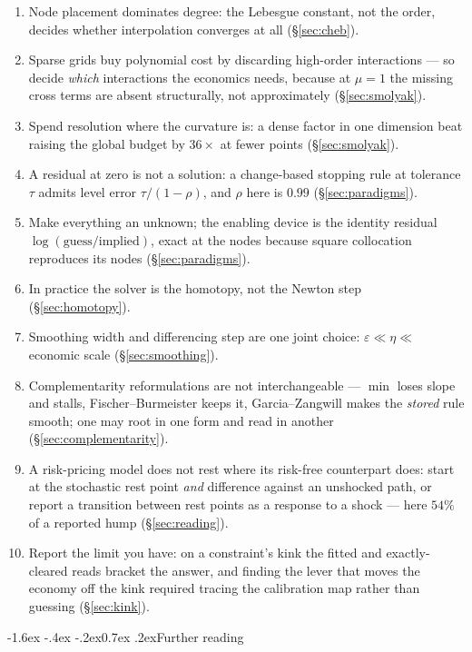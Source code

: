 \documentclass[10pt,a4paper]{article}
\makeatletter
\theoremstyle{definition}
\theoremstyle{plain}
\theoremstyle{remark}
\renewcommand\section{\@startsection{section}{1}{\z@}%
  {-1.6ex \@plus -.4ex \@minus -.2ex}{0.7ex \@plus.2ex}{\normalfont\large\bfseries}}
\makeatother
\begin{document}
\begin{enumerate}\itemsep0pt
\item Node placement dominates degree: the Lebesgue constant, not the order, decides whether
interpolation converges at all (\S\ref{sec:cheb}).
\item Sparse grids buy polynomial cost by discarding high-order interactions --- so decide
\emph{which} interactions the economics needs, because at $\mu=1$ the missing cross terms are
absent structurally, not approximately (\S\ref{sec:smolyak}).
\item Spend resolution where the curvature is: a dense factor in one dimension beat raising
the global budget by $36\times$ at fewer points (\S\ref{sec:smolyak}).
\item A residual at zero is not a solution: a change-based stopping rule at tolerance $\tau$
admits level error $\tau/(1-\rho)$, and $\rho$ here is $0.99$ (\S\ref{sec:paradigms}).
\item Make everything an unknown; the enabling device is the identity residual
$\log(\text{guess}/\text{implied})$, exact at the nodes because square collocation reproduces
its nodes (\S\ref{sec:paradigms}).
\item In practice the solver is the homotopy, not the Newton step (\S\ref{sec:homotopy}).
\item Smoothing width and differencing step are one joint choice:
$\varepsilon \ll \eta \ll$ economic scale (\S\ref{sec:smoothing}).
\item Complementarity reformulations are not interchangeable --- $\min$ loses slope and
stalls, Fischer--Burmeister keeps it, Garcia--Zangwill makes the \emph{stored} rule smooth;
one may root in one form and read in another (\S\ref{sec:complementarity}).
\item A risk-pricing model does not rest where its risk-free counterpart does: start at the
stochastic rest point \emph{and} difference against an unshocked path, or report a transition
between rest points as a response to a shock --- here $54\%$ of a reported hump
(\S\ref{sec:reading}).
\item Report the limit you have: on a constraint's kink the fitted and exactly-cleared reads
bracket the answer, and finding the lever that moves the economy off the kink required tracing
the calibration map rather than guessing (\S\ref{sec:kink}).
\end{enumerate}

\section{Further reading}
\end{document}
